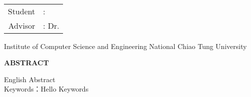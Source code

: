 \begin{titlepage}
  \begin{center}
    \LARGE
    \begin{singlespace}
  	 \textbf{\englishTitle{}} \\[0.5cm]
    \end{singlespace}
    
    \begin{singlespace}
    \begin{tabular}{r l}
    	Student     & : \studentEnName{}  \\
        Advisor  & : Dr. \advisorEnName{} \\[0.5cm]
    \end{tabular}
    \end{singlespace}
	
    \begin{singlespace}
    Institute of Computer Science and Engineering National Chiao Tung University\\[0.5cm]
    \end{singlespace}
    \textbf{ABSTRACT} \\[0.5cm]
    	
  \end{center}
  \normalsize 
  \hspace{0.6cm} English Abstract
  \\[0.7cm]
  Keywords：Hello Keywords
\end{titlepage}